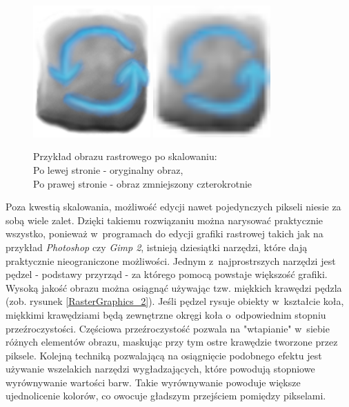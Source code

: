 \documentclass[12pt,a4paper,oneside]{book}
\theoremstyle{definition}
\numberwithin{equation}{chapter}
\begin{document}
\begin{figure}[hpt!]
        \centering
        \includegraphics[width=0.4\textwidth]{images/switch_on.png}
        \includegraphics[width=0.4\textwidth]{images/switch_on_50.png}
        \caption{Przykład obrazu rastrowego po skalowaniu: \\ Po lewej stronie - oryginalny obraz, \\ Po prawej stronie - obraz zmniejszony czterokrotnie}
        \label{RasterGraphics_1}
\end{figure}

\newpage
\par Poza kwestią skalowania, możliwość edycji nawet pojedynczych pikseli niesie za sobą wiele zalet. Dzięki takiemu rozwiązaniu można narysować praktycznie wszystko, ponieważ w~programach do edycji grafiki rastrowej takich jak na przykład \textit{Photoshop} czy \textit{Gimp 2}, istnieją dziesiątki narzędzi, które dają praktycznie nieograniczone możliwości. Jednym z~najprostrszych narzędzi jest pędzel - podstawy przyrząd - za którego pomocą powstaje większość grafiki. Wysoką jakość obrazu można osiągnąć używając tzw. miękkich krawędzi pędzla (zob. rysunek \ref{RasterGraphics_2}). Jeśli pędzel rysuje obiekty w~kształcie koła, miękkimi krawędziami będą zewnętrzne okręgi koła o~odpowiednim stopniu przeźroczystości. Częściowa przeźroczystość pozwala na "wtapianie" w~siebie różnych elementów obrazu, maskując przy tym ostre krawędzie tworzone przez piksele. Kolejną techniką pozwalającą na osiągnięcie podobnego efektu jest używanie wszelakich narzędzi wygładzających, które powodują stopniowe wyrównywanie wartości barw. Takie wyrównywanie powoduje większe ujednolicenie kolorów, co owocuje gładszym przejściem pomiędzy pikselami.
\end{document}

